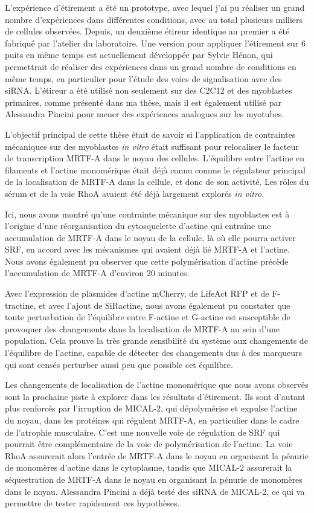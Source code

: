 L'expérience d'étirement a été un prototype, avec lequel j'ai pu réaliser un grand nombre d'expériences dans différentes conditions, avec au total plusieurs milliers de cellules observées. Depuis, un deuxième étireur identique au premier a été fabriqué par l'atelier du laboratoire. Une version pour appliquer l'étirement sur 6 puits en même temps est actuellement développée par Sylvie Hénon, qui permettrait de réaliser des expériences dans un grand nombre de conditions en même temps, en particulier pour l'étude des voies de signalisation avec des siRNA. 
L'étireur a été utilisé non seulement sur des C2C12 et des myoblastes primaires, comme présenté dans ma thèse, mais il est également utilisé par Alessandra Pincini pour mener des expériences analogues sur les myotubes. 

L'objectif principal de cette thèse était de savoir si l'application de contraintes mécaniques sur des myoblastes \textit{in vitro} était suffisant pour relocaliser le facteur de transcription MRTF-A dans le noyau des cellules. L'équilibre entre l'actine en filaments et l'actine monomérique était déjà connu comme le régulateur principal de la localisation de MRTF-A dans la cellule, et donc de son activité. Les rôles du sérum et de la voie RhoA avaient été déjà largement explorés \textit{in vitro}. 

Ici, nous avons montré qu'une contrainte mécanique sur des myoblastes est à l'origine d'une réorganisation du cytosquelette d'actine qui entraîne une accumulation de MRTF-A dans le noyau de la cellule, là où elle pourra activer SRF, en accord avec les mécanismes qui avaient déjà lié MRTF-A et l'actine. 
Nous avons également pu observer que cette polymérisation d'actine précède l'accumulation de MRTF-A d'environ 20 minutes. 

Avec l'expression de plasmides d'actine mCherry, de LifeAct RFP et de F-tractine, et avec l'ajout de SiRactine, nous avons également pu constater que toute perturbation de l'équilibre entre F-actine et G-actine est susceptible de provoquer des changements dans la localisation de MRTF-A au sein d'une population. Cela prouve la très grande sensibilité du système aux changements de l'équilibre de l'actine, capable de détecter des changements dus à des marqueurs qui sont censés perturber aussi peu que possible cet équilibre. 

Les changements de localisation de l'actine monomérique que nous avons observés sont la prochaine piste à explorer dans les résultats d'étirement. Ils sont d'autant plus renforcés par l'irruption de MICAL-2, qui dépolymérise et expulse l'actine du noyau, dans les protéines qui régulent MRTF-A, en particulier dans le cadre de l'atrophie musculaire. C'est une nouvelle voie de régulation de SRF qui pourrait être complémentaire de la voie de polymérisation de l'actine. La voie RhoA assurerait alors l'entrée de MRTF-A dans le noyau en organisant la pénurie de monomères d'actine dans le cytoplasme, tandis que MICAL-2 assurerait la séquestration de MRTF-A dans le noyau en organisant la pénurie de monomères dans le noyau. Alessandra Pincini a déjà testé des siRNA de MICAL-2, ce qui va permettre de tester rapidement ces hypothèses. 

